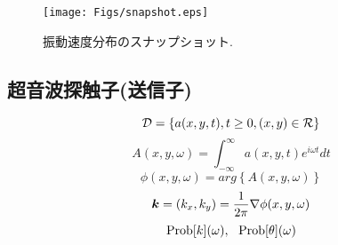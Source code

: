 ﻿%
\begin{figure}
\begin{center}
\texttt{[image: Figs/snapshot.eps]}
\caption{
	振動速度分布のスナップショット.
}
\label{fig:fig4}
\end{center}
\end{figure}
\subsection{超音波探触子(送信子)}
\begin{equation}
	{\cal D}=\left\{
		a(x,y,t), t\geq 0, (x,y)\in {\cal R}
	\right\}
	\label{eqn:}
\end{equation}
\begin{equation}
	A(x,y,\omega)=\int_{-\infty}^{\infty} a(x,y,t)e^{i\omega t} dt
	\label{eqn:}
\end{equation}
\begin{equation}
	\phi(x,y,\omega)=arg\left\{ A(x,y,\omega) \right\}
	\label{eqn:}
\end{equation}
\begin{equation}
	\fat{k}= (k_x,k_y)= \frac{1}{2\pi} \nabla \phi (x,y,\omega)
	\label{eqn:}
\end{equation}
\begin{equation}
	{\rm Prob} [k](\omega), \ \ 
	{\rm Prob} [\theta](\omega)
	\label{eqn:}
\end{equation}
